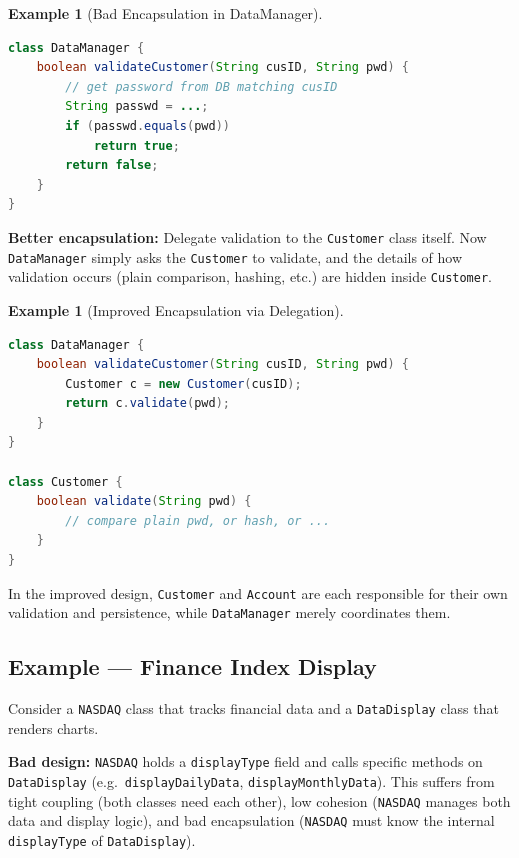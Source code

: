 \documentclass[11pt, a4paper, notitlepage]{report}
\theoremstyle{definition}
\theoremstyle{remark}
\theoremstyle{definition}
\newtheorem{example}[theorem]{Example}
\begin{document}
\begin{example}[Bad Encapsulation in DataManager]
\label{ex:ch9-bad-encap}
\leavevmode
\begin{lstlisting}[language=Java]
class DataManager {
    boolean validateCustomer(String cusID, String pwd) {
        // get password from DB matching cusID
        String passwd = ...;
        if (passwd.equals(pwd))
            return true;
        return false;
    }
}
\end{lstlisting}
\end{example}

\textbf{Better encapsulation:} Delegate validation to the \texttt{Customer} class itself.
Now \texttt{DataManager} simply asks the \texttt{Customer} to validate, and the details of
how validation occurs (plain comparison, hashing, etc.) are hidden inside \texttt{Customer}.

\begin{example}[Improved Encapsulation via Delegation]
\label{ex:ch9-good-encap}
\leavevmode
\begin{lstlisting}[language=Java]
class DataManager {
    boolean validateCustomer(String cusID, String pwd) {
        Customer c = new Customer(cusID);
        return c.validate(pwd);
    }
}

class Customer {
    boolean validate(String pwd) {
        // compare plain pwd, or hash, or ...
    }
}
\end{lstlisting}
\end{example}

In the improved design, \texttt{Customer} and \texttt{Account} are each responsible for their
own validation and persistence, while \texttt{DataManager} merely coordinates them.

\subsection{Example --- Finance Index Display}
\label{subsec:ch9-finance-example}

Consider a \texttt{NASDAQ} class that tracks financial data and a \texttt{DataDisplay} class
that renders charts.

\textbf{Bad design:} \texttt{NASDAQ} holds a \texttt{displayType} field and calls specific
methods on \texttt{DataDisplay} (e.g.\ \texttt{displayDailyData}, \texttt{displayMonthlyData}).
This suffers from tight coupling (both classes need each other), low cohesion (\texttt{NASDAQ}
manages both data and display logic), and bad encapsulation (\texttt{NASDAQ} must know the
internal \texttt{displayType} of \texttt{DataDisplay}).
\end{document}
